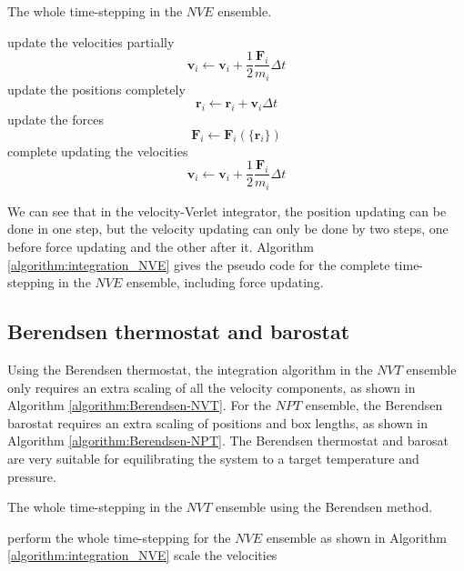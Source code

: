 \documentclass[12pt,a4paper]{report}
\newcommand{\vect}[1]{\boldsymbol{#1}}
\begin{document}
\begin{algorithm}[htb]
\caption{The whole time-stepping in the $NVE$ ensemble. }
\label{algorithm:integration_NVE}
\begin{algorithmic}[1]
\State update the velocities partially
\begin{equation}
\vect{v}_i \leftarrow \vect{v}_i + \frac{1}{2} \frac{\vect{F}_i}{m_i} \Delta t
\end{equation}
\State update the positions completely
\begin{equation}
\vect{r}_i \leftarrow \vect{r}_i + \vect{v}_i \Delta t
\end{equation}
\State update the forces
\begin{equation}
\vect{F}_i \leftarrow \vect{F}_i(\{\vect{r}_i\})
\end{equation}
\State complete updating the velocities
\begin{equation}
\vect{v}_i \leftarrow \vect{v}_i + \frac{1}{2} \frac{\vect{F}_i}{m_i} \Delta t
\end{equation}
 \end{algorithmic}
\end{algorithm}

We can see that in the velocity-Verlet integrator, the position updating can be done in one step, but the velocity updating can only be done by two steps, one before force updating and the other after it. Algorithm \ref{algorithm:integration_NVE} gives the pseudo code for the complete time-stepping in the $NVE$ ensemble, including force updating.


\subsection{Berendsen thermostat and barostat}

Using the Berendsen thermostat, the integration algorithm in the $NVT$ ensemble only requires an extra scaling of all the velocity components, as shown in Algorithm \ref{algorithm:Berendsen-NVT}. For the $NPT$ ensemble, the Berendsen barostat requires an extra scaling of positions and box lengths, as shown in Algorithm \ref{algorithm:Berendsen-NPT}. The Berendsen thermostat and barosat are very suitable for equilibrating the system to a target temperature and pressure.

\begin{algorithm}[htb]
\caption{The whole time-stepping in the $NVT$ ensemble using the Berendsen method. }
\label{algorithm:Berendsen-NVT}
\begin{algorithmic}[1]
\State perform the whole time-stepping for the $NVE$ ensemble as shown in Algorithm \ref{algorithm:integration_NVE}
\State scale the velocities
\end{algorithmic}
\end{algorithm}
\end{document}
